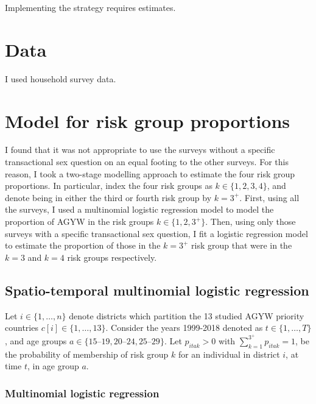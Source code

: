 \documentclass[a4paper, nobind]{templates/ociamthesis}
\begin{document}
Implementing the strategy requires estimates.

\hypertarget{data}{%
\section{Data}\label{data}}

I used household survey data.

\hypertarget{model-for-risk-group-proportions}{%
\section{Model for risk group proportions}\label{model-for-risk-group-proportions}}

I found that it was not appropriate to use the surveys without a specific transactional sex question on an equal footing to the other surveys.
For this reason, I took a two-stage modelling approach to estimate the four risk group proportions.
In particular, index the four risk groups as \(k \in \{1, 2, 3, 4\}\), and denote being in either the third or fourth risk group by \(k = 3^{+}\).
First, using all the surveys, I used a multinomial logistic regression model to model the proportion of AGYW in the risk groups \(k \in \{1, 2, 3^{+}\}\).
Then, using only those surveys with a specific transactional sex question, I fit a logistic regression model to estimate the proportion of those in the \(k = 3^{+}\) risk group that were in the \(k = 3\) and \(k = 4\) risk groups respectively.

\hypertarget{spatio-temporal-multinomial-logistic-regression}{%
\subsection{Spatio-temporal multinomial logistic regression}\label{spatio-temporal-multinomial-logistic-regression}}

Let \(i \in \{1, \ldots, n\}\) denote districts which partition the 13 studied AGYW priority countries \(c[i] \in \{1, \ldots, 13\}\).
Consider the years 1999-2018 denoted as \(t \in \{1, \ldots, T\}\), and age groups \(a \in \{\text{15--19}, \text{20--24}, \text{25--29}\}\).
Let \(p_{itak} > 0\) with \(\sum_{k = 1}^{3^{+}} p_{itak} = 1\), be the probability of membership of risk group \(k\) for an individual in district \(i\), at time \(t\), in age group \(a\).

\hypertarget{multinomial-logistic-regression}{%
\subsubsection{Multinomial logistic regression}\label{multinomial-logistic-regression}}
\end{document}
